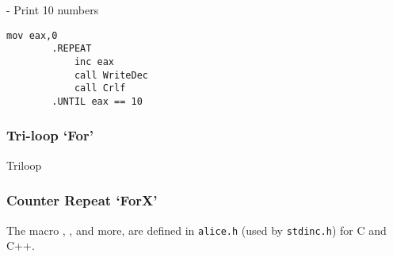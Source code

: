 	 - Print 10 numbers
	\begin{lstlisting}[language={[x86masm]Assembler}]
		mov eax,0
		.REPEAT
			inc eax
			call WriteDec
			call Crlf
		.UNTIL eax == 10
	\end{lstlisting}


\subsubsection{Tri-loop `For'}
{Triloop}


\subsubsection{Counter Repeat `ForX'}

	The macro , ,  and more, 
	are defined in \verb|alice.h| (used by \verb`stdinc.h`) for C and C++.


